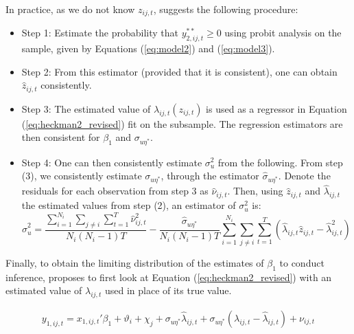 In practice, as we do not know $z_{ij,t}$, \cite{heckman1979sample} suggests the following procedure:

\begin{itemize}
    \item Step 1: Estimate the probability that $y^{**}_{2,ij,t} \geq 0$ using probit analysis on the sample, given by Equations (\ref{eq:model2}) and (\ref{eq:model3}).
    \item Step 2: From this estimator (provided that it is consistent), one can obtain $\hat{z}_{ij,t}$ consistently.
    \item Step 3: The estimated value of $\lambda_{ij,t}(z_{ij,t})$ is used as a regressor in Equation (\ref{eq:heckman2_revised}) fit on the subsample. The regression estimators are then consistent for $\beta_1$ and $\sigma_{u\eta^*}$.
    \item Step 4: One can then consistently estimate $\sigma_u^2$ from the following. From step (3), we consistently estimate $\sigma_{u\eta^*}$, through the estimator $\hat{\sigma}_{u\eta^*}$. Denote the residuals for each observation from step 3 as $\hat{\nu}_{ij,t}$. Then, using $\hat{z}_{ij,t}$ and $\hat{\lambda}_{ij,t}$ the estimated values from step (2), an estimator of  $\sigma_u^2$ is:
    $$\hat{\sigma}_u^2 = \frac{\sum_{i=1}^{N_i}\sum_{j\neq i}\sum_{t=1}^T \hat{\nu}_{ij,t}^2}{N_i(N_i-1)T} - \frac{\hat{\sigma}_{u\eta^*}}{N_i(N_i-1)T}  \sum_{i=1}^{N_i}\sum_{j\neq i}\sum_{t=1}^T (\hat{\lambda}_{ij,t} \hat{z}_{ij,t} - \hat{\lambda}_{ij,t}^2)$$
\end{itemize}

Finally, to obtain the limiting distribution of the estimates of $\beta_1$ to conduct inference, \cite{heckman1979sample} proposes to first look at Equation (\ref{eq:heckman2_revised}) with an estimated value of $\lambda_{ij,t}$ used in place of its true value.

\begin{align}
    y_{1,ij,t} = x_{1,ij,t}'\beta_1 + \vartheta_i + \chi_j + \sigma_{u\eta^*} \hat{\lambda}_{ij,t} + \sigma_{u\eta^*} ({\lambda}_{ij,t} - \hat{\lambda}_{ij,t}) + \nu_{ij,t}
    \label{eq:heckman_asy1}
\end{align}

